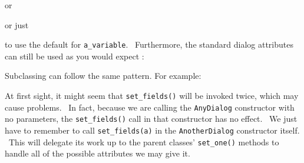 or


or just


\noindent to use the default for \texttt{a\_variable}. \ Furthermore, the standard
dialog attributes can still be used as you would expect :


Subclassing can follow the same pattern. For example:


At first sight, it might seem that \texttt{set\_fields()} will be
invoked twice, which may cause problems. \ In fact, because we are
calling the \texttt{AnyDialog} constructor with no parameters, the
\texttt{set\_fields()} call in that constructor has no effect. \ We
just have to remember to call \texttt{set\_fields(a)} in the
\texttt{AnotherDialog} constructor itself. \ This will delegate its
work up to the parent classes' \texttt{set\_one()}
methods to handle all of the possible attributes we may give it.

